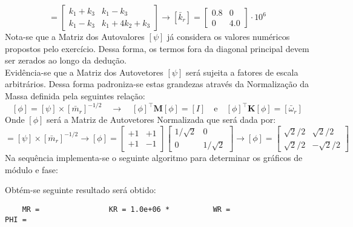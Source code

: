 \documentclass{article}
\begin{document}
\begin{resolution}
\begin{equation*}
    \end{equation*}
    \begin{equation*}
        [\bar{k}_r] = 
        \begin{bmatrix} k_1+k_3 & k_1-k_3\\ k_1-k_3 & k_1 + 4k_2 + k_3\end{bmatrix} \to 
        \boxed{[\bar{k}_r] = \begin{bmatrix} 0.8 & 0\\ 0 & 4.0\end{bmatrix}\cdot 10^6}
    \end{equation*}
    Nota-se que a Matriz dos Autovalores $[\psi]$ já considera os valores numéricos propostos pelo exercício. Dessa forma, os termos fora da diagonal principal devem ser zerados ao longo da dedução.\\

    Evidência-se que a Matriz dos Autovetores $[\psi]$ será sujeita a fatores de escala arbitrários. Dessa forma padroniza-se estas grandezas através da Normalização da Massa definida pela seguintes relação:
    \begin{equation}
        \boxed{[\phi] = [\psi] \times [\bar{m}_r]^{-1/2}}
        \quad \to \quad
        \boxed{[\phi]^\intercal \mathbf{M} [\phi] = [I]}
        \quad\text{e}\quad
        \boxed{[\phi]^\intercal \mathbf{K} [\phi] = [\bar{\omega}_r]}
    \end{equation}
    Onde $[\phi]$ será a Matriz de Autovetores Normalizada que será dada por:
    \begin{equation*}
        [\phi] = [\psi] \times [\bar{m}_r]^{-1/2}
        \to
        [\phi] = \begin{bmatrix} +1 & +1\\ +1 & -1\end{bmatrix} \begin{bmatrix} 1/\sqrt{2} & 0\\ 0 & 1/\sqrt{2}\end{bmatrix}
        \to 
        \boxed{[\phi] = \begin{bmatrix} \sqrt{2}/2 & \sqrt{2}/2\\ \sqrt{2}/2 & -\sqrt{2}/2\end{bmatrix}}
    \end{equation*}
    Na sequência implementa-se o seguinte algoritmo para determinar os gráficos de módulo e fase:
    \begin{scriptsize}
        \myMatlab
    \end{scriptsize}
    Obtém-se seguinte resultado será obtido:
    \begin{scriptsize}
        \myMatlab\begin{lstlisting}
    MR =                KR = 1.0e+06 *          WR =                        PHI =
    

\end{lstlisting}
\end{scriptsize}
\end{resolution}
\end{document}

